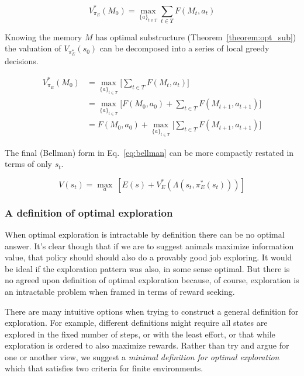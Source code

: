\documentclass[9pt,twocolumn,twoside]{pnas-new}
\begin{document}
\begin{equation} \label{eq:V_star}
    V^*_{\pi_E}(M_0) = \max_{\{a\}_{t \in T}} \sum_{t \in T} F(M_t, a_t)
\end{equation}

Knowing the memory $M$ has optimal substructure (Theorem~\ref{theorem:opt_sub}) the valuation of $V_{\pi_E^*}(s_0)$ can be decomposed into a series of local greedy decisions.

\begin{equation} \label{eq:bellman}
    \begin{split}
        V^*_{\pi_E}(M_0) &= \max_{\{a\}_{t \in T}} \Big [\sum_{t \in T} F(M_t, a_t)\Big ]\\
                         &= \max_{\{a\}_{t \in T}} \Big [F(M_0, a_0) + \sum_{t \in T}F(M_{t+1}, a_{t+1})\Big ]\\
                         &= F(M_0, a_0) + \max_{\{a\}_{t \in T}} \Big [\sum_{t \in T} F(M_{t+1}, a_{t+1}) \Big ]
    \end{split}
\end{equation}

The final (Bellman) form in Eq.~\ref{eq:bellman} can be more compactly restated in terms of only $s_t$.

\begin{equation} \label{eq:e_policy}
    V(s_t) = \max_a\ [ E(s) + V^*_E(\Lambda(s_t, \pi^*_E(s_t)))]
\end{equation}
    

\subsubsection*{A definition of optimal exploration}
When optimal exploration is intractable by definition there can be no optimal answer. It's clear though that if we are to suggest animals maximize information value, that policy should should also do a provably good job exploring. It would be ideal if the exploration pattern was also, in some sense optimal. But there is no agreed upon definition of optimal exploration because, of course, exploration is an intractable problem when framed in terms of reward seeking.

There are many intuitive options when trying to construct a general definition for exploration. For example, different definitions might require all states are explored in the fixed number of steps, or with the least effort, or that while exploration is ordered to also maximize rewards. Rather than try and argue for one or another view, we suggest a \textit{minimal definition for optimal exploration} which that satisfies two criteria for finite environments. 
\end{document}
